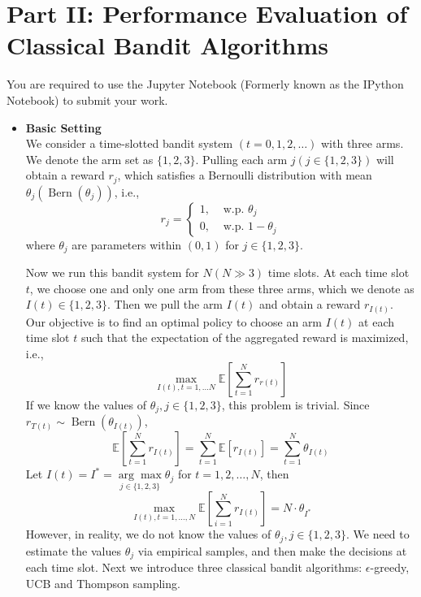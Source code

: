 \section{Part II: Performance Evaluation of Classical Bandit Algorithms}
You are required to use the Jupyter Notebook (Formerly known as the IPython Notebook) to submit your work.

\begin{itemize}
\item \textbf{Basic Setting} \\
We consider a time-slotted bandit system $(t=0,1,2, \ldots)$ with three arms. We denote the arm set as $\{1,2,3\}$. Pulling each arm $j(j \in\{1,2,3\})$ will obtain a reward $r_j$, which satisfies a Bernoulli distribution with mean $\theta_j\left(\operatorname{Bern}\left(\theta_j\right)\right)$, i.e.,
$$r_j= \begin{cases}1, & \text { w.p. } \theta_j \\ 0, & \text { w.p. } 1-\theta_j\end{cases}$$
where $\theta_j$ are parameters within $(0,1)$ for $j \in\{1,2,3\}$.

Now we run this bandit system for $N(N\gg 3)$ time slots. At each time slot $t$, we choose one and only one arm from these three arms, which we denote as $I(t) \in\{1,2,3\}$. Then we pull the arm $I(t)$ and obtain a reward $r_{I(t)}$. Our objective is to find an optimal policy to choose an arm $I(t)$ at each time slot $t$ such that the expectation of the aggregated reward is maximized, i.e.,
$$\max_{I(t), t=1, \ldots N} \mathbb{E}\left[\sum_{t=1}^N r_{r(t)}\right]$$
If we know the values of $\theta_j, j \in\{1,2,3\}$, this problem is trivial. Since $r_{T(t)} \sim \operatorname{Bern}\left(\theta_{I(t)}\right)$,
$$\mathbb{E}\left[\sum_{t=1}^N r_{I(t)}\right]=\sum_{t=1}^N \mathbb{E}\left[r_{I(t)}\right]=\sum_{t=1}^N \theta_{I(t)}$$
Let $I(t)=I^*=\underset{j \in\{1,2,3\}}{\arg \max } \theta_j$ for $t=1,2, \ldots, N$, then
$$\max _{I(t), t=1, \ldots, N} \mathbb{E}\left[\sum_{i=1}^N r_{I(t)}\right]=N \cdot \theta_{I^*}$$
However, in reality, we do not know the values of $\theta_j, j \in\{1,2,3\}$. We need to estimate the values $\theta_j$ via empirical samples, and then make the decisions at each time slot.
Next we introduce three classical bandit algorithms: $\epsilon$-greedy, UCB and Thompson sampling.


\end{itemize}
